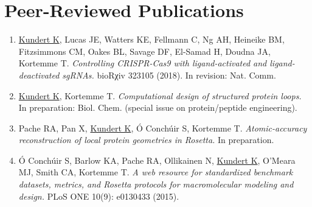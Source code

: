 \section{Peer-Reviewed Publications}

\begin{enumerate}

\item \underline{Kundert K}, Lucas JE, Watters KE, Fellmann C, Ng AH, Heineike 
    BM, Fitzsimmons CM, Oakes BL, Savage DF, El-Samad H, Doudna JA, Kortemme T.  
        \emph{Controlling CRISPR-Cas9 with ligand-activated and 
        ligand-deactivated sgRNAs.}  bioRχiv 323105 (2018).  In revision: Nat. 
        Comm.

\item \underline{Kundert K}, Kortemme T.  \emph{Computational design of 
    structured protein loops.}  In preparation: Biol. Chem. (special issue on 
        protein/peptide engineering).

\item Pache RA, Pan X, \underline{Kundert K}, Ó Conchúir S, Kortemme T.  
    \emph{Atomic-accuracy reconstruction of local protein geometries in 
        Rosetta.}  In preparation.

\item Ó Conchúir S, Barlow KA, Pache RA, Ollikainen N, \underline{Kundert K}, 
    O'Meara MJ, Smith CA, Kortemme T.  \emph{A web resource for standardized 
        benchmark datasets, metrics, and Rosetta protocols for macromolecular 
        modeling and design.}  PLoS ONE 10(9): e0130433 (2015).

\end{enumerate}


